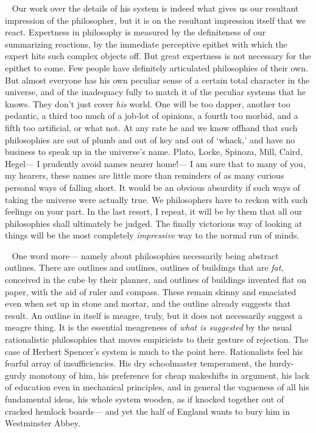 \documentclass[12pt]{article}
\newcounter{wjparagraph}[section]
\newcommand*{\wjparagraph}{\stepcounter{wjparagraph}~\marginpar{\tiny\arabic{wjparagraph} }}
\begin{document}
\wjparagraph
Our work over the details of his system is indeed what gives us our resultant impression of the philosopher, but it is on the resultant impression itself that we react. Expertness in philosophy is measured by the definiteness of our summarizing reactions, by the immediate perceptive epithet with which the expert hits such complex objects off. But great expertness is not necessary for the epithet to come. Few people have definitely articulated philosophies of their own. But almost everyone has his own peculiar sense of a certain total character in the universe, and of the inadequacy fully to match it of the peculiar systems that he knows. They don't just cover \emph{his} world. One will be too dapper, another too pedantic, a third too much of a job-lot of opinions, a fourth too morbid, and a fifth too artificial, or what not. At any rate he and we know offhand that such philosophies are out of plumb and out of key and out of `whack,' and have no business to speak up in the universe's name. Plato, Locke, Spinoza, Mill, Caird, Hegel--- I prudently avoid names nearer home!--- I am sure that to many of you, my hearers, these names are little more than reminders of as many curious personal ways of falling short. It would be an obvious absurdity if such ways of taking the universe were actually true. We philosophers have to reckon with such feelings on your part. In the last resort, I repeat, it will be by them that all our philosophies shall ultimately be judged. The finally victorious way of looking at things will be the most completely \emph{impressive} way to the normal run of minds.

\wjparagraph
One word more--- namely about philosophies necessarily being abstract outlines. There are outlines and outlines, outlines of buildings that are \emph{fat}, conceived in the cube by their planner, and outlines of buildings invented flat on paper, with the aid of ruler and compass. These remain skinny and emaciated even when set up in stone and mortar, and the outline already suggests that result. An outline in itself is meagre, truly, but it does not necessarily suggest a meagre thing. It is the essential meagreness of \emph{what is suggested} by the usual rationalistic philosophies that moves empiricists to their gesture of rejection. The case of Herbert Spencer's system is much to the point here. Rationalists feel his fearful array of insufficiencies. His dry schoolmaster temperament, the hurdy-gurdy monotony of him, his preference for cheap makeshifts in argument, his lack of education even in mechanical principles, and in general the vagueness of all his fundamental ideas, his whole system wooden, as if knocked together out of cracked hemlock boards--- and yet the half of England wants to bury him in Westminster Abbey.
\end{document}
